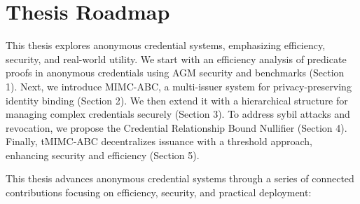 \section*{Thesis Roadmap}

This thesis explores anonymous credential systems, emphasizing efficiency, security, and real-world utility. We start with an efficiency analysis of predicate proofs in anonymous credentials using AGM security and benchmarks (Section 1). Next, we introduce MIMC-ABC, a multi-issuer system for privacy-preserving identity binding (Section 2). We then extend it with a hierarchical structure for managing complex credentials securely (Section 3). To address sybil attacks and revocation, we propose the Credential Relationship Bound Nullifier (Section 4). Finally, tMIMC-ABC decentralizes issuance with a threshold approach, enhancing security and efficiency (Section 5).


This thesis advances anonymous credential systems through a series of connected contributions focusing on efficiency, security, and practical deployment:

